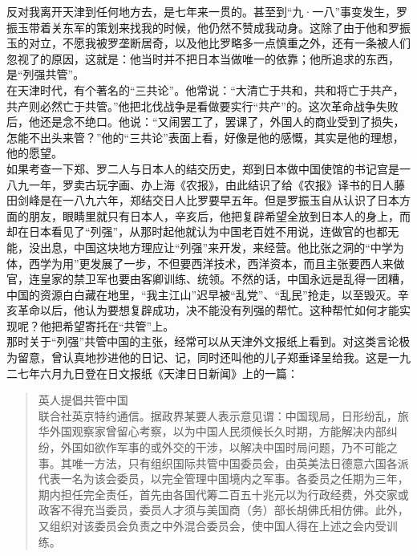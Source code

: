 反对我离开天津到任何地方去，是七年来一贯的。甚至到“九·一八”事变发生，罗振玉带着关东军的策划来找我的时候，他仍然不赞成我动身。这除了由于他和罗振玉的对立，不愿我被罗垄断居奇，以及他比罗略多一点慎重之外，还有一条被人们忽视了的原因，这就是：他当时并不把日本当做唯一的依靠；他所追求的东西，是“列强共管”。\\

在天津时代，有个著名的“三共论”。他常说：“大清亡于共和，共和将亡于共产，共产则必然亡于共管。”他把北伐战争是看做要实行“共产”的。这次革命战争失败后，他还是念不绝口。他说：“又闹罢工了，罢课了，外国人的商业受到了损失，怎能不出头来管？”他的“三共论”表面上看，好像是他的感慨，其实是他的理想，他的愿望。\\

如果考查一下郑、罗二人与日本人的结交历史，郑到日本做中国使馆的书记宫是一八九一年，罗卖古玩字画、办上海《农报》，由此结识了给《农报》译书的日人藤田剑峰是在一八九六年，郑结交日人比罗要早五年。但是罗振玉自从认识了日本方面的朋友，眼睛里就只有日本人，辛亥后，他把复辟希望全放到日本人的身上，而却在日本看见了“列强”，从那时起他就认为中国老百姓不用说，连做官的也都无能，没出息，中国这块地方理应让“列强”来开发，来经营。他比张之洞的“中学为体，西学为用”更发展了一步，不但要西洋技术，西洋资本，而且主张要西人来做官，连皇家的禁卫军也要由客卿训练、统领。不然的话，中国永远是乱得一团糟，中国的资源白白藏在地里，“我主江山”迟早被“乱党”、“乱民”抢走，以至毁灭。辛亥革命以后，他认为要想复辟成功，决不能没有列强的帮忙。这种帮忙如何才能实现呢？他把希望寄托在“共管”上。\\

那时关于“列强”共管中国的主张，经常可以从天津外文报纸上看到。对这类言论极为留意，曾认真地抄进他的日记、记，同时还叫他的儿子郑垂译呈给我。这是一九二七年六月九日登在日文报纸《天津日日新闻》上的一篇：\\

\begin{quote}
	英人提倡共管中国\\

联合社英京特约通信。据政界某要人表示意见谓：中国现局，日形纷乱，旅华外国观察家曾留心考察，以为中国人民须候长久时期，方能解决内部纠纷，外国如欲作军事的或外交的干涉，以解决中国时局问题，乃不可能之事。其唯一方法，只有组织国际共管中国委员会，由英美法日德意六国各派代表一名为该会委员，以完全管理中国境内之军事。各委员之任期为三年，期内担任完全责任，首先由各国代筹二百五十兆元以为行政经费，外交家或政客不得充当委员，委员人才须与美国商（务）部长胡佛氏相仿佛。此外，又组织对该委员会负责之中外混合委员会，使中国人得在上述之会内受训练。\\
\end{quote}

